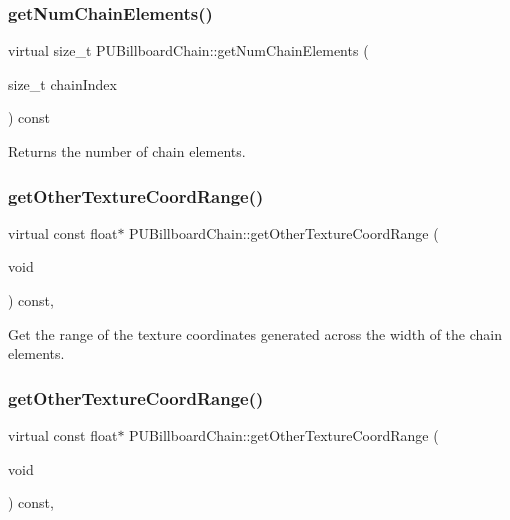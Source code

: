 \subsubsection{\texorpdfstring{get\+Num\+Chain\+Elements()}{getNumChainElements()}\hspace{0.1cm}{\footnotesize\ttfamily [2/2]}}
{\footnotesize\ttfamily virtual size\+\_\+t P\+U\+Billboard\+Chain\+::get\+Num\+Chain\+Elements (\begin{DoxyParamCaption}\item[{size\+\_\+t}]{chain\+Index }\end{DoxyParamCaption}) const\hspace{0.3cm}{\ttfamily [virtual]}}

Returns the number of chain elements. \mbox{\label{classPUBillboardChain_af17d5dd54f8ef5331ef2613ca937b199}} 
\subsubsection{\texorpdfstring{get\+Other\+Texture\+Coord\+Range()}{getOtherTextureCoordRange()}\hspace{0.1cm}{\footnotesize\ttfamily [1/2]}}
{\footnotesize\ttfamily virtual const float$\ast$ P\+U\+Billboard\+Chain\+::get\+Other\+Texture\+Coord\+Range (\begin{DoxyParamCaption}\item[{void}]{ }\end{DoxyParamCaption}) const\hspace{0.3cm}{\ttfamily [inline]}, {\ttfamily [virtual]}}

Get the range of the texture coordinates generated across the width of the chain elements. \mbox{\label{classPUBillboardChain_af17d5dd54f8ef5331ef2613ca937b199}} 
\subsubsection{\texorpdfstring{get\+Other\+Texture\+Coord\+Range()}{getOtherTextureCoordRange()}\hspace{0.1cm}{\footnotesize\ttfamily [2/2]}}
{\footnotesize\ttfamily virtual const float$\ast$ P\+U\+Billboard\+Chain\+::get\+Other\+Texture\+Coord\+Range (\begin{DoxyParamCaption}\item[{void}]{ }\end{DoxyParamCaption}) const\hspace{0.3cm}{\ttfamily [inline]}, {\ttfamily [virtual]}}

